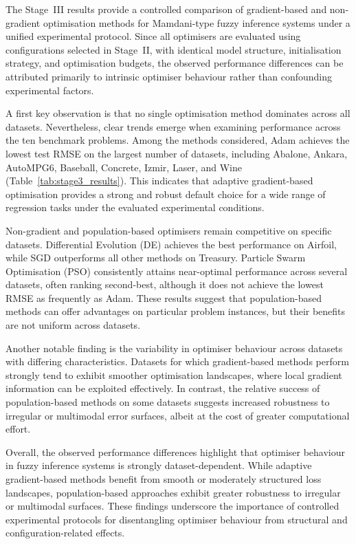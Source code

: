 \documentclass[conference]{IEEEtran}
\begin{document}
The Stage~III results provide a controlled comparison of gradient-based and
non-gradient optimisation methods for Mamdani-type fuzzy inference systems under
a unified experimental protocol.
Since all optimisers are evaluated using configurations selected in Stage~II,
with identical model structure, initialisation strategy, and optimisation
budgets, the observed performance differences can be attributed primarily to
intrinsic optimiser behaviour rather than confounding experimental factors.

A first key observation is that no single optimisation method dominates across
all datasets.
Nevertheless, clear trends emerge when examining performance across the ten
benchmark problems.
Among the methods considered, Adam achieves the lowest test RMSE on the largest
number of datasets, including Abalone, Ankara, AutoMPG6, Baseball, Concrete,
Izmir, Laser, and Wine (Table~\ref{tab:stage3_results}).
This indicates that adaptive gradient-based optimisation provides a strong and
robust default choice for a wide range of regression tasks under the evaluated
experimental conditions.

Non-gradient and population-based optimisers remain competitive on specific
datasets.
Differential Evolution (DE) achieves the best performance on Airfoil, while SGD
outperforms all other methods on Treasury.
Particle Swarm Optimisation (PSO) consistently attains near-optimal performance
across several datasets, often ranking second-best, although it does not achieve
the lowest RMSE as frequently as Adam.
These results suggest that population-based methods can offer advantages on
particular problem instances, but their benefits are not uniform across
datasets.

Another notable finding is the variability in optimiser behaviour across
datasets with differing characteristics.
Datasets for which gradient-based methods perform strongly tend to exhibit
smoother optimisation landscapes, where local gradient information can be
exploited effectively.
In contrast, the relative success of population-based methods on some datasets
suggests increased robustness to irregular or multimodal error surfaces, albeit
at the cost of greater computational effort.

Overall, the observed performance differences highlight that optimiser behaviour
in fuzzy inference systems is strongly dataset-dependent.
While adaptive gradient-based methods benefit from smooth or moderately
structured loss landscapes, population-based approaches exhibit greater
robustness to irregular or multimodal surfaces.
These findings underscore the importance of controlled experimental protocols
for disentangling optimiser behaviour from structural and configuration-related
effects.
\end{document}
